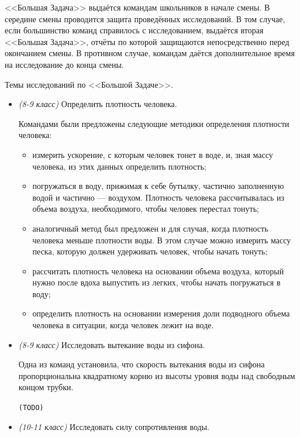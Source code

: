 \documentclass[12pt,a4paper,oneside,draft]{scrartcl}
\newlength{\h}
\newlength{\x}
\newcommand{\com}[1]{{\Large{\texttt{{\color{red}(#1)}}}}}
\begin{document}
<<Большая Задача>> выдаётся командам школьников в начале смены. В
середине смены проводится защита проведённых исследований. В том
случае, если большинство команд справилось с исследованием, выдаётся
вторая <<Большая Задача>>, отчёты по которой защищаются
непосредственно перед окончанием смены. В противном случае, командам
даётся дополнительное время на исследование до конца смены.

\begin{center}
  \textsf{Темы исследований по <<Большой Задаче>>.}
\end{center}

\begin{itemize}
\item \textit{(8-9 класс)} Определить плотность человека.

Командами были предложены следующие методики определения плотности 
человека:
\begin{itemize}
\item измерить ускорение, с которым человек тонет в воде, и, зная 
  массу человека, из этих данных определить плотность;
\item погружаться в воду, прижимая к себе бутылку, частично 
  заполненную водой и частично --- воздухом. Плотность человека 
  рассчитывалась из объема воздуха, необходимого, чтобы человек 
  перестал тонуть;
\item аналогичный метод был предложен и для случая, когда плотность 
  человека меньше плотности воды. В этом случае можно измерить массу 
  песка, которую должен удерживать человек, чтобы начать тонуть;
\item рассчитать плотность человека на основании объема воздуха, 
  который нужно после вдоха выпустить из легких, чтобы начать 
  погружаться в воду;
\item определить плотность на основании измерения доли подводного 
  объема человека в ситуации, когда человек лежит на воде.
\end{itemize}

\item \textit{(8-9 класс)} Исследовать вытекание воды из сифона.

Одна из команд установила, что скорость вытекания воды из сифона 
  пропорциональна квадратному корню из высоты уровня воды над 
  свободным концом трубки.

\com{TODO}

\item \textit{(10-11 класс)} Исследовать силу сопротивления воды. 
\end{itemize}
\end{document}

